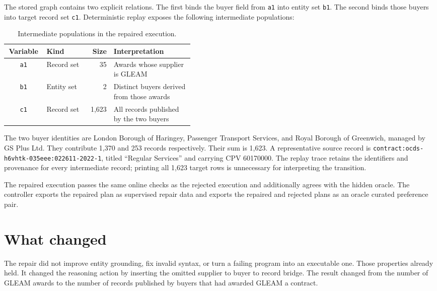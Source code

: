 \documentclass[10pt]{article}
\begin{document}
The stored graph contains two explicit relations.  The first binds the buyer field from
\texttt{a1} into entity set \texttt{b1}.  The second binds those buyers into target record set
\texttt{c1}.  Deterministic replay exposes the following intermediate populations:

\begin{table}[h]
\centering
\small
\begin{tabular}{clrp{0.43\linewidth}}
\toprule
Variable & Kind & Size & Interpretation \\
\midrule
\texttt{a1} & Record set & 35 & Awards whose supplier is GLEAM \\
\texttt{b1} & Entity set & 2 & Distinct buyers derived from those awards \\
\texttt{c1} & Record set & 1,623 & All records published by the two buyers \\
\bottomrule
\end{tabular}
\caption{Intermediate populations in the repaired execution.}
\end{table}

The two buyer identities are London Borough of Haringey, Passenger Transport Services, and Royal
Borough of Greenwich, managed by GS Plus Ltd.  They contribute 1,370 and 253 records respectively.
Their sum is 1,623.  A representative source record is
\texttt{contract:ocds-h6vhtk-035eee:022611-2022-1}, titled ``Regular Services'' and carrying CPV
60170000.  The replay trace retains the identifiers and provenance for every intermediate record;
printing all 1,623 target rows is unnecessary for interpreting the transition.

The repaired execution passes the same online checks as the rejected execution and additionally
agrees with the hidden oracle.  The controller exports the repaired plan as supervised repair data
and exports the repaired and rejected plans as an oracle curated preference pair.

\section{What changed}

The repair did not improve entity grounding, fix invalid syntax, or turn a failing program into an
executable one.  Those properties already held.  It changed the reasoning action by inserting the
omitted supplier to buyer to record bridge.  The result changed from the number of GLEAM awards to
the number of records published by buyers that had awarded GLEAM a contract.
\end{document}
